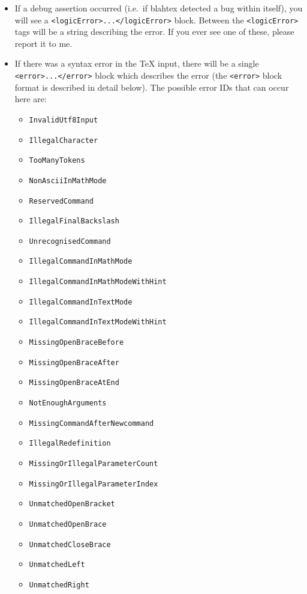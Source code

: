 \documentclass{article}
\begin{document}
\begin{itemize}
\item If a debug assertion occurred (i.e.~if blahtex detected a bug within itself), you will see a \texttt{<logicError>...</logicError>} block. Between the \texttt{<logicError>} tags will be a string describing the error. If you ever see one of these, please report it to me.

\item If there was a syntax error in the \TeX{} input, there will be a single \texttt{<error>...</error>} block which describes the error (the \texttt{<error>} block format is described in detail below). The possible error IDs that can occur here are:

\begin{itemize}
\item \texttt{InvalidUtf8Input}
\item \texttt{IllegalCharacter}
\item \texttt{TooManyTokens}
\item \texttt{NonAsciiInMathMode}
\item \texttt{ReservedCommand}
\item \texttt{IllegalFinalBackslash} 
\item \texttt{UnrecognisedCommand}
\item \texttt{IllegalCommandInMathMode}
\item \texttt{IllegalCommandInMathModeWithHint}
\item \texttt{IllegalCommandInTextMode}
\item \texttt{IllegalCommandInTextModeWithHint}
\item \texttt{MissingOpenBraceBefore}
\item \texttt{MissingOpenBraceAfter}
\item \texttt{MissingOpenBraceAtEnd}
\item \texttt{NotEnoughArguments}
\item \texttt{MissingCommandAfterNewcommand}
\item \texttt{IllegalRedefinition}
\item \texttt{MissingOrIllegalParameterCount}
\item \texttt{MissingOrIllegalParameterIndex}
\item \texttt{UnmatchedOpenBracket}
\item \texttt{UnmatchedOpenBrace}
\item \texttt{UnmatchedCloseBrace}
\item \texttt{UnmatchedLeft}
\item \texttt{UnmatchedRight}

\end{itemize}
\end{itemize}
\end{document}
